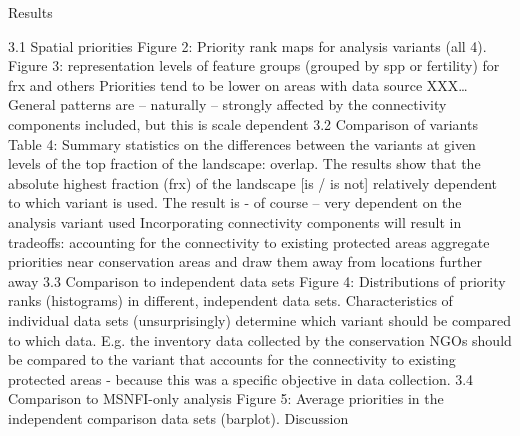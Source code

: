 \documentclass[]{article}
\begin{document}
Results

3.1 Spatial priorities Figure 2: Priority rank maps for analysis
variants (all 4). Figure 3: representation levels of feature groups
(grouped by spp or fertility) for frx and others Priorities tend to be
lower on areas with data source XXX\ldots{} General patterns are --
naturally -- strongly affected by the connectivity components included,
but this is scale dependent 3.2 Comparison of variants Table 4: Summary
statistics on the differences between the variants at given levels of
the top fraction of the landscape: overlap. The results show that the
absolute highest fraction (frx) of the landscape {[}is / is not{]}
relatively dependent to which variant is used. The result is - of course
-- very dependent on the analysis variant used Incorporating
connectivity components will result in tradeoffs: accounting for the
connectivity to existing protected areas aggregate priorities near
conservation areas and draw them away from locations further away 3.3
Comparison to independent data sets Figure 4: Distributions of priority
ranks (histograms) in different, independent data sets. Characteristics
of individual data sets (unsurprisingly) determine which variant should
be compared to which data. E.g. the inventory data collected by the
conservation NGOs should be compared to the variant that accounts for
the connectivity to existing protected areas - because this was a
specific objective in data collection. 3.4 Comparison to MSNFI-only
analysis Figure 5: Average priorities in the independent comparison data
sets (barplot). Discussion
\end{document}
